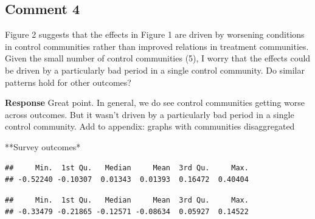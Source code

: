 \documentclass[
]{article}
\newenvironment{Shaded}{\begin{snugshade}}{\end{snugshade}}
\newcommand{\CommentTok}[1]{\textcolor[rgb]{0.56,0.35,0.01}{\textit{#1}}}
\newcommand{\DecValTok}[1]{\textcolor[rgb]{0.00,0.00,0.81}{#1}}
\newcommand{\DocumentationTok}[1]{\textcolor[rgb]{0.56,0.35,0.01}{\textbf{\textit{#1}}}}
\newcommand{\FunctionTok}[1]{\textcolor[rgb]{0.00,0.00,0.00}{#1}}
\newcommand{\NormalTok}[1]{#1}
\newcommand{\SpecialCharTok}[1]{\textcolor[rgb]{0.00,0.00,0.00}{#1}}
\begin{document}
\hypertarget{comment-4}{%
\subsection{Comment 4}\label{comment-4}}

Figure 2 suggests that the effects in Figure 1 are driven by worsening
conditions in control communities rather than improved relations in
treatment communities. Given the small number of control communities
(5), I worry that the effects could be driven by a particularly bad
period in a single control community. Do similar patterns hold for other
outcomes?

\textbf{Response} Great point. In general, we do see control communities
getting worse across outcomes. But it wasn't driven by a particularly
bad period in a single control community. Add to appendix: graphs with
communities disaggregated

**Survey outcomes*

\begin{Shaded}
\end{Shaded}

\begin{verbatim}
##     Min.  1st Qu.   Median     Mean  3rd Qu.     Max. 
## -0.52240 -0.10307  0.01343  0.01393  0.16472  0.40404
\end{verbatim}

\begin{Shaded}
\end{Shaded}

\begin{verbatim}
##     Min.  1st Qu.   Median     Mean  3rd Qu.     Max. 
## -0.33479 -0.21865 -0.12571 -0.08634  0.05927  0.14522
\end{verbatim}
\end{document}
